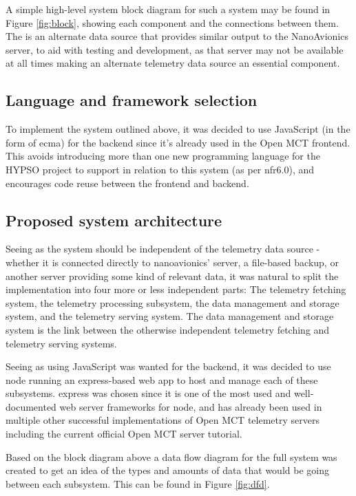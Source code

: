 A simple high-level system block diagram for such a system may be found in Figure \ref{fig:block}, showing each component and the connections between them. The  is an alternate data source that provides similar output to the NanoAvionics server, to aid with testing and development, as that server may not be available at all times making an alternate telemetry data source an essential component.

\subsection{Language and framework selection}
To implement the system outlined above, it was decided to use JavaScript (in the form of \Gls{ecma}) for the \gls{backend} since it’s already used in the Open MCT \gls{frontend}. This avoids introducing more than one new programming language for the HYPSO project to support in relation to this system (as per \acrshort{nfr}6.0), and encourages code reuse between the \gls{frontend} and \gls{backend}.

\subsection{Proposed system architecture}
Seeing as the system should be independent of the telemetry data source - whether it is connected directly to \Gls{nanoavionics}’ server, a file-based backup, or another server providing some kind of relevant data, it was natural to split the implementation into four more or less independent parts: The telemetry fetching system, the telemetry processing subsystem, the data management and storage system, and the telemetry serving system. The data management and storage system is the link between the otherwise independent telemetry fetching and telemetry serving systems.

Seeing as using JavaScript was wanted for the backend, it was decided to use \Gls{node} running an \Gls{express}-based web app to host and manage each of these subsystems. \Gls{express} was chosen since it is one of the most used and well-documented web server frameworks for \Gls{node}, and has already been used in multiple other successful implementations of Open MCT telemetry servers including the current official Open MCT server tutorial.

Based on the block diagram above a data flow diagram for the full system was created to get an idea of the types and amounts of data that would be going between each subsystem. This can be found in Figure \ref{fig:dfd}.

